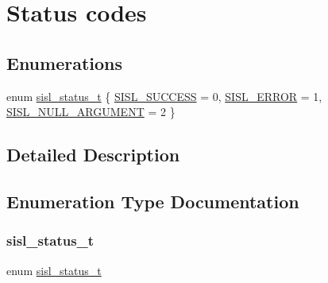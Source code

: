 \hypertarget{group__status}{}\section{Status codes}
\label{group__status}
\subsection*{Enumerations}
\begin{DoxyCompactItemize}
\item 
enum \mbox{\hyperlink{group__status_ga82c112a16803c9ddebc065a1b0f16287}{sisl\+\_\+status\+\_\+t}} \{ \mbox{\hyperlink{group__status_gga82c112a16803c9ddebc065a1b0f16287a60b9f04752a2c4dd6214f8a4fd7d913b}{S\+I\+S\+L\+\_\+\+S\+U\+C\+C\+E\+SS}} = 0, 
\mbox{\hyperlink{group__status_gga82c112a16803c9ddebc065a1b0f16287a333a15fde6c5ab88e3f7448240815f5a}{S\+I\+S\+L\+\_\+\+E\+R\+R\+OR}} = 1, 
\mbox{\hyperlink{group__status_gga82c112a16803c9ddebc065a1b0f16287a68c2b945ac9193d3b47b0cc0e6fb38d3}{S\+I\+S\+L\+\_\+\+N\+U\+L\+L\+\_\+\+A\+R\+G\+U\+M\+E\+NT}} = 2
 \}
\end{DoxyCompactItemize}


\subsection{Detailed Description}


\subsection{Enumeration Type Documentation}
\mbox{\label{group__status_ga82c112a16803c9ddebc065a1b0f16287}} 
\subsubsection{\texorpdfstring{sisl\+\_\+status\+\_\+t}{sisl\_status\_t}}
{\footnotesize\ttfamily enum \mbox{\hyperlink{group__status_ga82c112a16803c9ddebc065a1b0f16287}{sisl\+\_\+status\+\_\+t}}}

